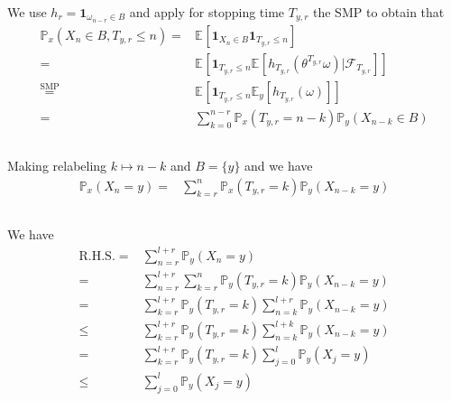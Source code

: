 \documentclass[11pt,a4paper]{ctexart}
\numberwithin{equation}{section}%
\newcommand{\F}{\mathcal{F}}
\begin{document}
We use $ h_r = \mathbf{1}_{\omega _{n-r} \in B} $ and apply for stopping time $ T_{y,r} $ the SMP to obtain that
\begin{align*}
    \mathbb{P}_{ x }\left( X_n\in B, T_{y,r} \leq n \right)  =& \mathbb{E}_{  }\left[ \mathbf{1}_{X_n\in B} \mathbf{1}_{T_{y,r}\leq n} \right] \\
    =& \mathbb{E}_{  }\left[ \mathbf{1}_{T_{y,r}\leq n} \mathbb{E}_{  }\left[ h_{T_{y,r}}(\theta ^{T_{y,r}}\omega ) | \F_{T_{y,r}} \right] \right] \\
    \mathop{ = }\limits^{\text{SMP}} & \mathbb{E}_{  }\left[ \mathbf{1}_{T_{y,r}\leq n} \mathbb{E}_{ y }\left[ h_{T_{y,r}}(\omega ) \right] \right] \\
    =& \sum_{k=0}^{n-r} \mathbb{P}_{ x }\left( T_{y,r} = n-k \right) \mathbb{P}_{ y }\left( X_{n-k} \in B \right) 
\end{align*}

\subsection{}

Making relabeling $ k \mapsto n-k $ and $ B= \{y\} $ and we have
\begin{align*}
    \mathbb{P}_{ x }\left( X_n=y \right)  =& \sum_{k=r}^n \mathbb{P}_{ x }\left( T_{y,r} = k \right) \mathbb{P}_{ y }\left( X_{n-k} = y \right) 
\end{align*}


\subsection{}

We have
\begin{align*}
     \mathrm{R.H.S.}=& \sum_{n=r}^{l+r}\mathbb{P}_{ y }\left( X_n = y \right) \\
     =& \sum_{n=r}^{l+r}\sum_{k=r}^n \mathbb{P}_{ y }\left( T_{y,r} = k \right) \mathbb{P}_{ y }\left( X_{n-k} = y \right) \\
     =&\sum_{k=r}^{l+r}\mathbb{P}_{ y }\left( T_{y,r}=k \right) \sum_{n=k}^{l+r} \mathbb{P}_{ y }\left( X_{n-k} = y \right) \\
     \leq&\sum_{k=r}^{l+r}\mathbb{P}_{ y }\left( T_{y,r}=k \right) \sum_{n=k}^{l+k} \mathbb{P}_{ y }\left( X_{n-k} = y \right) \\
     =&\sum_{k=r}^{l+r}\mathbb{P}_{ y }\left( T_{y,r}=k \right) \sum_{j=0}^l \mathbb{P}_{ y }\left( X_j = y \right) \\
     \leq&  \sum_{j=0}^l \mathbb{P}_{ y }\left( X_j = y \right)
\end{align*}
\end{document}
